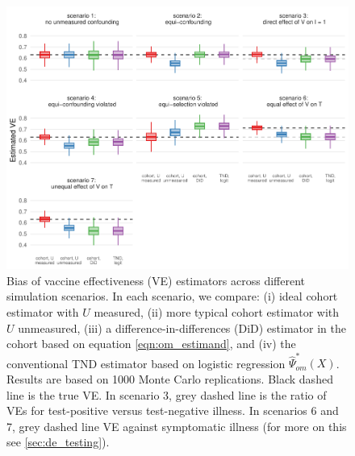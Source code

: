 \documentclass[11pt]{article}
\begin{document}
\begin{figure}
    \centering
    \includegraphics{../results/sims1.pdf}
    \caption{
        Bias of vaccine effectiveness (VE) estimators across different simulation scenarios. In each scenario, we compare: (i) ideal cohort estimator with $U$ measured, (ii) more typical cohort estimator with $U$ unmeasured, (iii) a difference-in-differences (DiD) estimator in the cohort based on equation \ref{eqn:om_estimand}, and (iv) the conventional TND estimator based on logistic regression $\widehat{\Psi}_{om}^*(X)$. Results are based on 1000 Monte Carlo replications. Black dashed line is the true VE. In scenario 3, grey dashed line is the ratio of VEs for test-positive versus test-negative illness. In scenarios 6 and 7, grey dashed line VE against symptomatic illness (for more on this see  \ref{sec:de_testing}).}
    \label{fig:sims1}
\end{figure}
\end{document}

